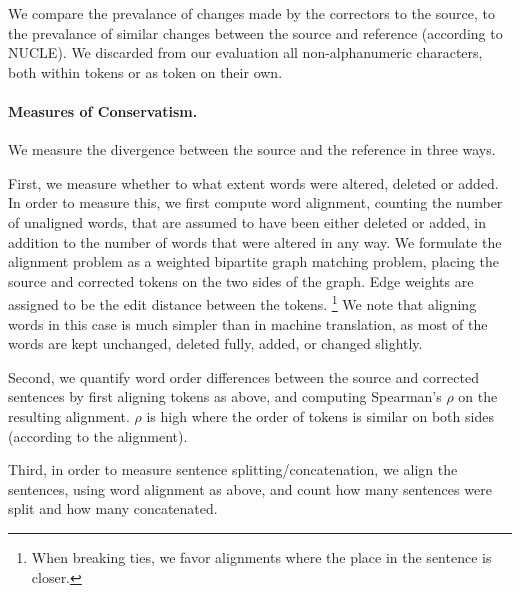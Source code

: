 \documentclass[letter,11pt]{article}
\newcommand{\oa}[1]{\footnote{\color{red}OA: #1}}
\begin{document}
We compare the prevalance of changes made by the correctors to the source,
to the prevalance of similar changes between the source and reference (according to NUCLE).
We discarded from our evaluation all non-alphanumeric
characters, both within tokens or as token on their own.



\paragraph{Measures of Conservatism.}
We measure the divergence between the source and the reference in three ways.

First, we measure whether to what extent words were altered, deleted or added.
In order to measure this, we first compute word alignment,
counting the number of unaligned words, that are assumed to have been either
deleted or added, in addition to the number of words that
were altered in any way.
We formulate the alignment problem as a weighted bipartite graph matching problem,
placing the source and corrected tokens on the two sides of the graph.
Edge weights are assigned to be the edit distance between the tokens.
\footnote{When breaking ties, we favor alignments where the place in the sentence is closer.}
We note that aligning words in this case is much simpler than in machine translation,
as most of the words are kept unchanged, deleted fully, added, or changed slightly.


Second, we quantify word order differences between the source and corrected sentences
by first aligning tokens as above, and computing Spearman's $\rho$ on the resulting alignment.
$\rho$ is high where the order of tokens is similar on both sides (according to the alignment).

Third, in order to measure sentence splitting/concatenation, we align
the sentences, using word alignment as above, and count how many sentences were split
and how many concatenated.
\end{document}
